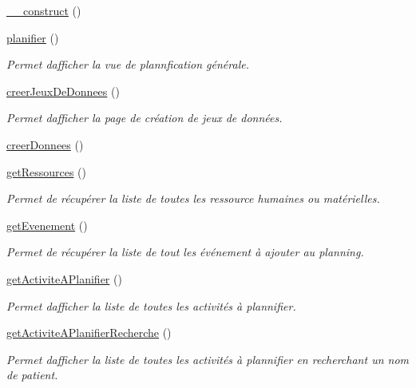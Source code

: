 \begin{DoxyCompactItemize}
\item 
\hyperlink{class_planning_a146136bb4d11559d4e1e03ee27cdc1d5}{\+\_\+\+\_\+construct} ()
\item 
\hyperlink{class_planning_a9d08178f98ae683a155391a6dbfbf8ed}{planifier} ()
\begin{DoxyCompactList}\small\item\em Permet d\textquotesingle{}afficher la vue de plannfication générale. \end{DoxyCompactList}\item 
\hyperlink{class_planning_ab6b4d7163168dc39004b3efc72b03864}{creer\+Jeux\+De\+Donnees} ()
\begin{DoxyCompactList}\small\item\em Permet d\textquotesingle{}afficher la page de création de jeux de données. \end{DoxyCompactList}\item 
\hyperlink{class_planning_a43c29aa96386074e1970bd897ff35a7f}{creer\+Donnees} ()
\item 
\hyperlink{class_planning_a6eb383b4098e8ba4e077e38b580ebc20}{get\+Ressources} ()
\begin{DoxyCompactList}\small\item\em Permet de récupérer la liste de toutes les ressource humaines ou matérielles. \end{DoxyCompactList}\item 
\hyperlink{class_planning_a0e4778f75bae9880dac4dcef097e0196}{get\+Evenement} ()
\begin{DoxyCompactList}\small\item\em Permet de récupérer la liste de tout les événement à ajouter au planning. \end{DoxyCompactList}\item 
\hyperlink{class_planning_a5e204727ba60baf33ea8e45ffd57459c}{get\+Activite\+A\+Planifier} ()
\begin{DoxyCompactList}\small\item\em Permet d\textquotesingle{}afficher la liste de toutes les activités à plannifier. \end{DoxyCompactList}\item 
\hyperlink{class_planning_a37907a80875259e9962aacda1e9431cd}{get\+Activite\+A\+Planifier\+Recherche} ()
\begin{DoxyCompactList}\small\item\em Permet d\textquotesingle{}afficher la liste de toutes les activités à plannifier en recherchant un nom de patient. \end{DoxyCompactList}\item 

\end{DoxyCompactItemize}
